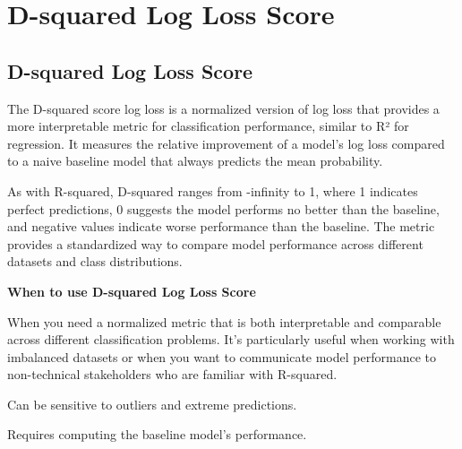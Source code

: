 \clearpage
\thispagestyle{classificationstyle}
\section{D-squared Log Loss Score}
\subsection{D-squared Log Loss Score}

The D-squared score log loss is a normalized version of log loss that provides a more interpretable metric for classification performance, similar to R² for regression.
It measures the relative improvement of a model's log loss compared to a naive baseline model that always predicts the mean probability.

\begin{center}
\end{center}

As with R-squared, D-squared ranges from -infinity to 1, where 1 indicates perfect predictions, 0 suggests the model performs no better than the baseline, and negative values indicate
worse performance than the baseline. The metric provides a standardized way to compare model performance across different datasets and class distributions.

\textbf{When to use D-squared Log Loss Score}

When you need a normalized metric that is both interpretable and comparable across different classification problems. It's particularly useful when working with imbalanced
datasets or when you want to communicate model performance to non-technical stakeholders who are familiar with R-squared.

{
    \item Can be sensitive to outliers and extreme predictions.
    \item Requires computing the baseline model's performance.
}

